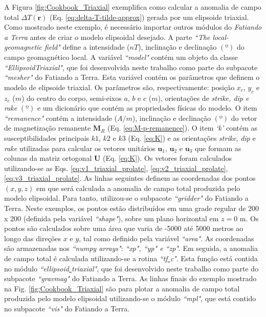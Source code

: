 A Figura \ref{fig:Cookbook_Triaxial} exemplifica como calcular a anomalia de campo total $\Delta T (\mathbf{r})$ (Eq. \ref{eq:delta-T-tilde-approx}) gerada por um elipsoide triaxial.
Como mostrado neste exemplo, é necessário importar outros módulos do \textit{Fatiando a Terra} antes de criar o modelo elipsoidal desejado.
A parte \textit{``The local-geomagnetic field"} define a intensidade ($nT$), inclinação e declinação $(º)$ do campo geomagnético local.
A variável \textit{``model"} contém um objeto da classe \textit{``EllipsoidTriaxial"}, que foi desenvolvida neste trabalho como parte do subpacote \textit{``mesher"} do Fatiando a Terra. Esta variável contém os parâmetros que definem o modelo de elipsoide triaxial. Os parâmetros são, respectivamente: posição $x_c$, $y_c$ e $z_c$ ($m$) do centro do corpo, semi-eixos $a$, $b$ e $c$ ($m$), orientações de \textit{strike, dip e rake} $(º)$ e um dicionário que contém as propriedades físicas do modelo. O item \textit{``remanence"} contém a intensidade ($A/m$), inclinação e declinação $(º)$ do vetor de magnetização remanente $\mathbf{M}_{R}$ (Eq. \ref{eq:M-p-remanence}). O item \textit{`k'} contém as susceptibilidades principais $k1$, $k2$ e $k3$ (Eq. \ref{eq:K}) e as orientações \textit{strike}, \textit{dip} e \textit{rake} utilizadas para calcular os vetores unitários $\mathbf{u}_{1}$, $\mathbf{u}_{2}$ e $\mathbf{u}_{3}$ que formam as colunas da matriz ortogonal $\mathbf{U}$ (Eq. \ref{eq:K}). Os vetores foram calculados utilizando-se as Eqs. \ref{eq:v1_triaxial_prolate},
\ref{eq:v2_triaxial_prolate}, \ref{eq:v3_triaxial_prolate}.
As linhas seguintes definem as coordenadas dos pontos $(x, y, z)$ em que será calculada a anomalia de campo total produzida pelo modelo elipsoidal.
Para tanto, utilizou-se o subpacote \textit{``gridder"} do Fatiando a Terra. Neste exemplos, os pontos estão distribuídos em uma grade regular de 200 x 200 (definida pela variável \textit{``shape"}), sobre um plano horizontal em $z = 0$ m. Os pontos são calculados sobre uma área que varia de -5000 até 5000 metros ao longo das direções $x$ e $y$, tal como definido pela variável \textit{``area"}.
As coordenadas são armazenadas nos \textit{``numpy arrays"}: \textit{``xp", ``yp" e ``zp"}. Em seguida, a anomalia de campo total é calculada utilizando-se a rotina \textit{``tf\underline{ }c"}. Esta função está contida no módulo \textit{``ellipsoid\underline{ }triaxial"}, que foi desenvolvido neste trabalho como parte do subpacote \textit{``gravmag"} do Fatiando a Terra. As linhas finais do exemplo mostrado na Fig. \ref{fig:Cookbook_Triaxial} são para plotar a anomalia de campo total produzida pelo modelo elipsoidal utilizando-se o módulo \textit{``mpl"}, que está contido no subpacote \textit{``vis"} do Fatiando a Terra.

